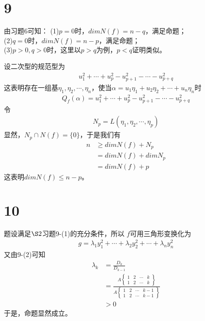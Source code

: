 \documentclass{article}
\begin{document}
\section*{9}

由习题6可知：
(1)$p = 0$时，$dim N(f) = n - q$，满足命题；\\
(2)$q = 0$时，$dim N(f) = n - p$，满足命题；\\
(3)$p > 0, q > 0$时，这里以$p > q$为例，$p < q$证明类似。

设二次型的规范型为
\begin{align*}
  u_1^2 + \cdots + u_p^2 - u_{p+1}^2 - \cdots - u_{p + q}^2
\end{align*}
这表明存在一组基$\eta_1, \eta_2, \cdots, \eta_n$，使当$\alpha = u_1 \eta_1 + u_2 \eta_2 + \cdots + u_n \eta_n$时
\begin{align*}
  Q_f(\alpha) = u_1^2 + \cdots + u_p^2 - u_{p+1}^2 - \cdots - u_{p + q}^2
\end{align*}
令
\begin{align*}
  N_p = L(\eta_1, \eta_2, \cdots, \eta_p)
\end{align*}
显然，$N_p \cap N(f) = \{0\}$，于是我们有
\begin{align*}
  n & \geq dim N(f) + N_p  \\
    & = dim N(f) + dim N_p \\
    & = dim N(f) + p
\end{align*}
这表明$dim N(f) \leq n - p$。

\section*{10}

题设满足$\S2 $习题9-(1)的充分条件，所以
$f$可用三角形变换化为
\begin{align*}
  g = \lambda_1 y_1^2 + \cdots + \lambda_2 y_2^2 + \cdots + \lambda_n y_n^2
\end{align*}
又由9-(2)可知
\begin{align*}
  \lambda_k & = \frac{D_k}{D_{k - 1}}                         \\
            & = \frac{A \begin{Bmatrix}
                            1 & 2 & \cdots & k \\
                            1 & 2 & \cdots & k
                          \end{Bmatrix}}{A \begin{Bmatrix}
                                             1 & 2 & \cdots & k-1 \\
                                             1 & 2 & \cdots & k-1
                                           \end{Bmatrix}} \\
            & > 0
\end{align*}
于是，命题显然成立。
\end{document}

